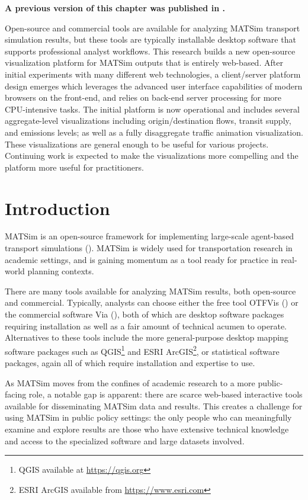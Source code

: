 \textbf{A previous version of this chapter was published in \citet{CharltonLaudan2020WebBasedVisualization}.}

Open-source and commercial tools are available for analyzing MATSim transport simulation results, but these tools are typically installable desktop software that supports professional analyst workflows. This research builds a new open-source visualization platform for MATSim outputs that is entirely web-based. After initial experiments with many different web technologies, a client/server platform design emerges which leverages the advanced user interface capabilities of modern browsers on the front-end, and relies on back-end server processing for more CPU-intensive tasks. The initial platform is now operational and includes several aggregate-level visualizations including origin/destination flows, transit supply, and emissions levels; as well as a fully disaggregate traffic animation visualization. These visualizations are general enough to be useful for various projects. Continuing work is expected to make the visualizations more compelling and the platform more useful for practitioners.

\hypertarget{mathub-introduction}{%
\section{Introduction}\label{introduction}}

MATSim is an open-source framework for implementing large-scale agent-based transport simulations (\cite{MATSimBook}). MATSim is widely used for transportation research in academic settings, and is gaining momentum as a tool ready for practice in real-world planning contexts.

There are many tools available for analyzing MATSim results, both open-source and commercial. Typically, analysts can choose either the free tool OTFVis (\cite{Srippgen2015OTFVisInBook}) or the commercial software Via (\cite{Rieser2015SenozonViaInBook}), both of which are desktop software packages requiring installation as well as a fair amount of technical acumen to operate. Alternatives to these tools include the more general-purpose desktop mapping software packages such as QGIS\footnote{QGIS available at \url{https://qgis.org}} and ESRI ArcGIS\footnote{ESRI ArcGIS available from \url{https://www.esri.com}}, or statistical software packages, again all of which require installation and expertise to use.

As MATSim moves from the confines of academic research to a more public-facing role, a notable gap is apparent: there are scarce web-based interactive tools available for disseminating MATSim data and results. This creates a challenge for using MATSim in public policy settings: the only people who can meaningfully examine and explore results are those who have extensive technical knowledge and access to the specialized software and large datasets involved.

